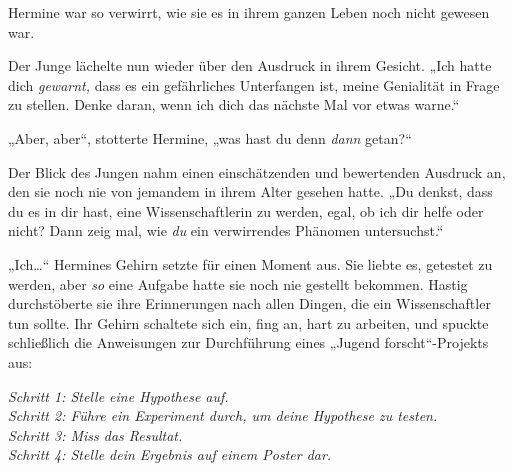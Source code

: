 Hermine war so verwirrt, wie sie es in ihrem ganzen Leben noch nicht gewesen war.

Der Junge lächelte nun wieder über den Ausdruck in ihrem Gesicht. „Ich hatte dich \emph{gewarnt,} dass es ein gefährliches Unterfangen ist, meine Genialität in Frage zu stellen. Denke daran, wenn ich dich das nächste Mal vor etwas warne.“

„Aber, aber“, stotterte Hermine, „was hast du denn \emph{dann} getan?“

Der Blick des Jungen nahm einen einschätzenden und bewertenden Ausdruck an, den sie noch nie von jemandem in ihrem Alter gesehen hatte. „Du denkst, dass du es in dir hast, eine Wissenschaftlerin zu werden, egal, ob ich dir helfe oder nicht? Dann zeig mal, wie \emph{du} ein verwirrendes Phänomen untersuchst.“

„Ich…“ Hermines Gehirn setzte für einen Moment aus. Sie liebte es, getestet zu werden, aber \emph{so} eine Aufgabe hatte sie noch nie gestellt bekommen. Hastig durchstöberte sie ihre Erinnerungen nach allen Dingen, die ein Wissenschaftler tun sollte. Ihr Gehirn schaltete sich ein, fing an, hart zu arbeiten, und spuckte schließlich die Anweisungen zur Durchführung eines „Jugend forscht“-Projekts aus:

\emph{%
Schritt 1: Stelle eine Hypothese auf.\\
Schritt 2: Führe ein Experiment durch, um deine Hypothese zu testen.\\
Schritt 3: Miss das Resultat.\\
Schritt 4: Stelle dein Ergebnis auf einem Poster dar.%
}

